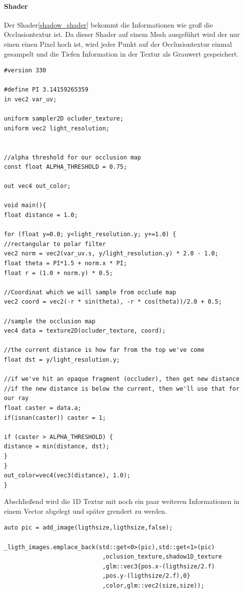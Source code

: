 \paragraph{Shader}
Der Shader\ref{shadow_shader} bekommt die Informationen wie groß die Occlusiontextur ist.
Da dieser Shader auf einem Mesh ausgeführt wird der nur einen einen Pixel hoch ist, wird jeder Punkt auf der Occlusiontextur einmal gesampelt und die Tiefen Information in der Textur als Grauwert gespeichert.

\begin{lstlisting}[caption=Shadowmaper Shader,label=shadow_shader]
#version 330

#define PI 3.14159265359
in vec2 var_uv;

uniform sampler2D ocluder_texture;
uniform vec2 light_resolution;


//alpha threshold for our occlusion map
const float ALPHA_THRESHOLD = 0.75;

out vec4 out_color;

void main(){
float distance = 1.0;

for (float y=0.0; y<light_resolution.y; y+=1.0) {
//rectangular to polar filter
vec2 norm = vec2(var_uv.s, y/light_resolution.y) * 2.0 - 1.0;
float theta = PI*1.5 + norm.x * PI;
float r = (1.0 + norm.y) * 0.5;

//Coordinat which we will sample from occlude map
vec2 coord = vec2(-r * sin(theta), -r * cos(theta))/2.0 + 0.5;

//sample the occlusion map
vec4 data = texture2D(ocluder_texture, coord);

//the current distance is how far from the top we've come
float dst = y/light_resolution.y;

//if we've hit an opaque fragment (occluder), then get new distance
//if the new distance is below the current, then we'll use that for our ray
float caster = data.a;
if(isnan(caster)) caster = 1;

if (caster > ALPHA_THRESHOLD) {
distance = min(distance, dst);
}
}
out_color=vec4(vec3(distance), 1.0);
}
\end{lstlisting}

Abschließend wird die 1D Textur mit noch ein paar weiteren Informationen in einem Vector abgelegt und später grendert zu werden.

\begin{lstlisting}
auto pic = add_image(ligthsize,ligthsize,false);

_ligth_images.emplace_back(std::get<0>(pic),std::get<1>(pic)
							,oclusion_texture,shadow1D_texture
							,glm::vec3{pos.x-(ligthsize/2.f)
							,pos.y-(ligthsize/2.f),0}
							,color,glm::vec2(size,size));
\end{lstlisting}

